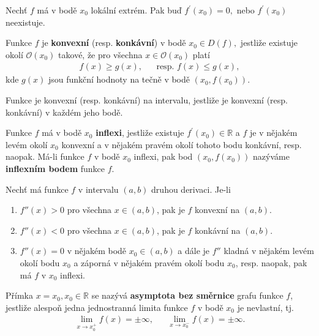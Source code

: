 \begin{veta}
Nechť $f$ má v bodě $x_0$ lokální extrém. Pak buď $f^\prime(x_0)=0,$ nebo
$f^\prime(x_0)$ neexistuje.
\end{veta}

\begin{definition}\label{konvkonk}
Funkce $f$ je \textbf{konvexní} (resp. \textbf{konkávní}) v bodě $x_0\in D(f),$
jestliže existuje okolí $\mathscr O(x_0)$ takové, že pro všechna $x\in\mathscr O(x_0)$
platí
\begin{align*}
    f(x)\geq g(x), & & \textrm{resp. } f(x)\leq g(x),
\end{align*}
kde $g(x)$ jsou funkční hodnoty na tečně v bodě $(x_0,f(x_0)).$

Funkce je konvexní (resp. konkávní) na intervalu, jestliže je konvexní (resp.
konkávní) v každém jeho bodě.
\end{definition}

\begin{definition}
Funkce $f$ má v bodě $x_0$ \textbf{inflexi}, jestliže existuje $f^\prime(x_0) \in
\mathbb R$ a $f$ je v nějakém levém okolí $x_0$ konvexní a v nějakém pravém okolí
tohoto bodu konkávní, resp. naopak. Má-li funkce $f$ v bodě $x_0$ inflexi, pak bod
$(x_0, f(x_0))$ nazýváme \textbf{inflexním bodem} funkce $f$.
\end{definition}

\begin{veta}
Nechť má funkce $f$ v intervalu $(a,b)$ druhou derivaci. Je-li
\begin{enumerate}[$i.$]
\item $f'' (x)>0$ pro všechna $x \in (a,b)$, pak je $f$
konvexní na $(a,b)$.
\item $f''(x)<0$ pro všechna $x \in (a,b)$, pak je $f$
konkávní na $(a,b)$.
\item $f''(x)=0$ v nějakém bodě $x_0\in(a,b)$ a dále je $f''$
kladná v nějakém levém okolí bodu $x_0$ a záporná v nějakém pravém okolí bodu $x_0$,
resp. naopak, pak má $f$ v $x_0$ inflexi.
\end{enumerate}
\end{veta}

\begin{definition}
Přímka $x=x_0,x_0\in \mathbb R$ se nazývá \textbf{asymptota bez směrnice}
grafu funkce $f$, jestliže alespoň jedna jednostranná limita funkce $f$
v bodě $x_0$ je nevlastní, tj.
\begin{align*}
    \lim_{x\to x_0^+} f(x) = \pm\infty, & & \lim_{x\to x_0^-} f(x)=\pm\infty.
\end{align*}
\end{definition}

